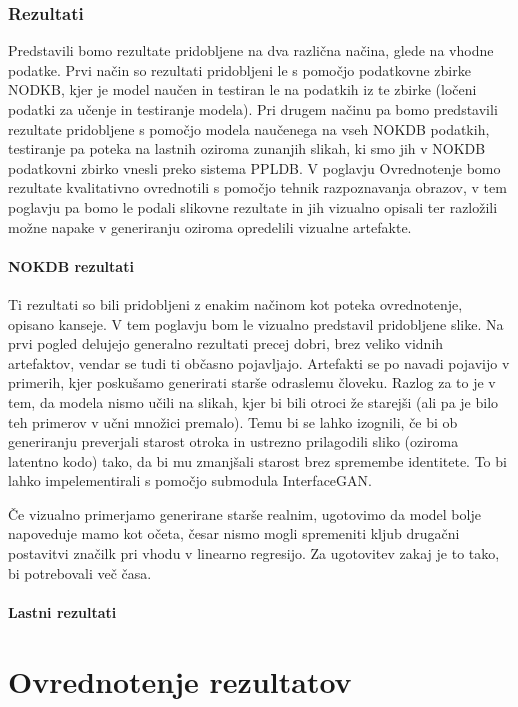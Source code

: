 \documentclass[a4paper,12pt,openright]{book}
\begin{document}
\subsection{Rezultati}

Predstavili bomo rezultate pridobljene na dva različna načina, glede na vhodne podatke. 
Prvi način so rezultati pridobljeni le s pomočjo podatkovne zbirke NODKB, kjer je model naučen in testiran le na podatkih iz te zbirke (ločeni podatki za učenje in testiranje modela).
Pri drugem načinu pa bomo predstavili rezultate pridobljene s pomočjo modela naučenega na vseh NOKDB podatkih, testiranje pa poteka na lastnih oziroma zunanjih slikah, ki smo jih v NOKDB podatkovni zbirko vnesli preko sistema PPLDB.
V poglavju Ovrednotenje bomo rezultate kvalitativno ovrednotili s pomočjo tehnik razpoznavanja obrazov, v tem poglavju pa bomo le podali slikovne rezultate in jih vizualno opisali ter razložili možne napake v generiranju oziroma opredelili vizualne artefakte.


\subsubsection{NOKDB rezultati}
Ti rezultati so bili pridobljeni z enakim načinom kot poteka ovrednotenje, opisano kanseje. V tem poglavju bom le vizualno predstavil pridobljene slike.
Na prvi pogled delujejo generalno rezultati precej dobri, brez veliko vidnih artefaktov, vendar se tudi ti občasno pojavljajo. Artefakti se po navadi pojavijo v primerih, kjer poskušamo generirati starše odraslemu človeku. Razlog za to je v tem, da modela nismo učili na slikah, kjer bi bili otroci že starejši (ali pa je bilo teh primerov v učni množici premalo). 
Temu bi se lahko izognili, če bi ob generiranju preverjali starost otroka in ustrezno prilagodili sliko (oziroma latentno kodo) tako, da bi mu zmanjšali starost brez spremembe identitete. To bi lahko impelementirali s pomočjo submodula InterfaceGAN. 

Če vizualno primerjamo generirane starše realnim, ugotovimo da model bolje napoveduje mamo kot očeta, česar nismo mogli spremeniti kljub drugačni postavitvi značilk pri vhodu v linearno regresijo. Za ugotovitev zakaj je to tako, bi potrebovali več časa.

\subsubsection{Lastni rezultati}


\chapter{Ovrednotenje rezultatov}
\end{document}

